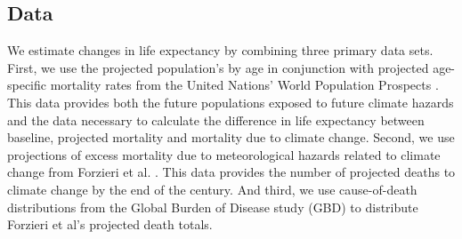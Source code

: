 \documentclass[12pt]{article}
\begin{document}
\subsection{Data}\label{data}

We estimate changes in life expectancy by combining three primary data
sets. First, we use the projected population's by age in conjunction
with projected age-specific mortality rates from the United Nations'
World Population Prospects \citep{united2017world}. This data provides
both the future populations exposed to future climate hazards and the
data necessary to calculate the difference in life expectancy between
baseline, projected mortality and mortality due to climate change.
Second, we use projections of excess mortality due to meteorological
hazards related to climate change from Forzieri et al.
\citeyearpar{forzieri2017increasing}. This data provides the number of
projected deaths to climate change by the end of the century. And third,
we use cause-of-death distributions from the Global Burden of Disease
study (GBD) \citep{GBD, wang2012age} to distribute Forzieri et al's
\citeyearpar{forzieri2017increasing} projected death totals.
\end{document}
